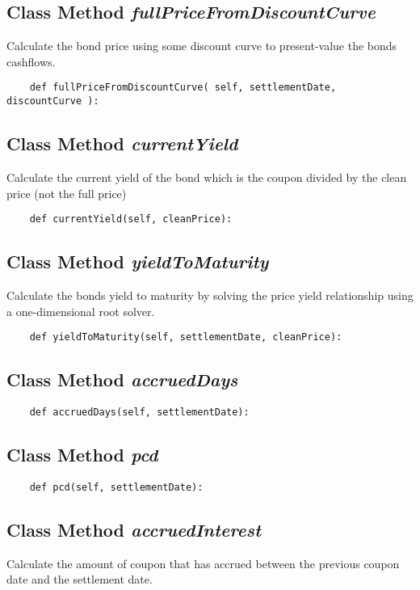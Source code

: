 \documentclass[twoside,11pt]{book}
\begin{document}
\subsection{Class Method {\it fullPriceFromDiscountCurve}}
Calculate the bond price using some discount curve to present-value the bonds cashflows. 

\begin{lstlisting}
    def fullPriceFromDiscountCurve( self, settlementDate, discountCurve ):
\end{lstlisting}

\subsection{Class Method {\it currentYield}}
Calculate the current yield of the bond which is the coupon divided by the clean price (not the full price)

\begin{lstlisting}
    def currentYield(self, cleanPrice):
\end{lstlisting}

\subsection{Class Method {\it yieldToMaturity}}
Calculate the bonds yield to maturity by solving the price yield relationship using a one-dimensional root solver. 

\begin{lstlisting}
    def yieldToMaturity(self, settlementDate, cleanPrice):
\end{lstlisting}

\subsection{Class Method {\it accruedDays}}


\begin{lstlisting}
    def accruedDays(self, settlementDate):
\end{lstlisting}

\subsection{Class Method {\it pcd}}


\begin{lstlisting}
    def pcd(self, settlementDate):
\end{lstlisting}

\subsection{Class Method {\it accruedInterest}}
Calculate the amount of coupon that has accrued between the previous coupon date and the settlement date. 
\end{document}
